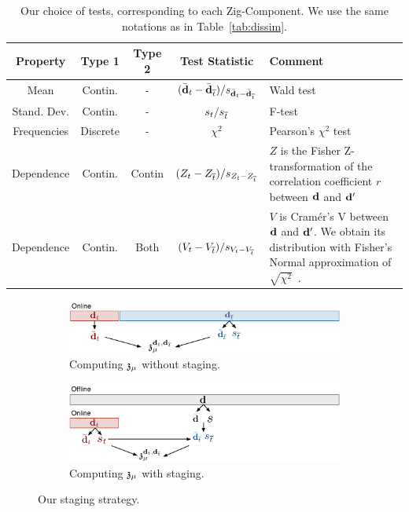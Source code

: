 \begin{table}[t!]
    \centering
    \begin{tabular}{c c c c p{8cm}}
    \rowcolor{gray!50}
      \hline
      Property & Type 1 & Type 2 & Test Statistic & Comment\\
      \hline
      Mean & Contin.  & - & $(\bar{\bf{d}}_t - \bar{\bf{d}}_{\overline{t}})/s_{\bar{\bf{d}}_t - \bar{\bf{d}}_{\overline{t}}}$ &
        Wald test~\cite{wasserman2013all}  \\
        Stand. Dev.& Contin.  & - & $s_t / s_{\overline{t}}$ &
        F-test~\cite{cohen1977statistical} \\
        Frequencies & Discrete & - & $\chi^2$ & Pearson's $\chi^2$
        test~\cite{wasserman2013all}\\
      Dependence  & Contin. & Contin & $(Z_t - 
      Z_{\overline{t}})/s_{Z_t - Z_{\overline{t}}}$ & $Z$ is the Fisher
      Z-transformation of the correlation coefficient $r$ between $\bf{d}$ and
      $\bf{d}'$~\cite{fisher1915frequency}\\
      Dependence  & Contin. & Both &  $(V_t - V_{\overline{t}})/s_{V_t-V_{\overline{t}}}$ & $V$ is
      Cram\'er's V between $\bf{d}$ and $\bf{d}'$. We obtain its distribution with Fisher's
      Normal approximation of $\sqrt{\chi^2}$~\cite{patel1996handbook}.\\ 
      \hline
    \end{tabular}
\caption{Our choice of tests, corresponding to each Zig-Component. We use the
same notations as in Table~\ref{tab:dissim}.}
    \label{tab:tests}
\end{table}
\begin{figure}[t!]
    \centering
    \begin{subfigure}[b]{\columnwidth}
    \includegraphics[width=\textwidth]{Figures/Staging}
    \caption{Computing $\mathfrak{z}_\mu$ without staging.}
    \label{pic:withoutstag}
    \end{subfigure}

    \begin{subfigure}[b]{\columnwidth}
        \includegraphics[width=\textwidth]{Figures/Staging2}
    \caption{Computing  $\mathfrak{z}_\mu$  with staging.}
    \label{pic:withstag}
    \end{subfigure}
    \caption{Our staging strategy.}
\end{figure}


